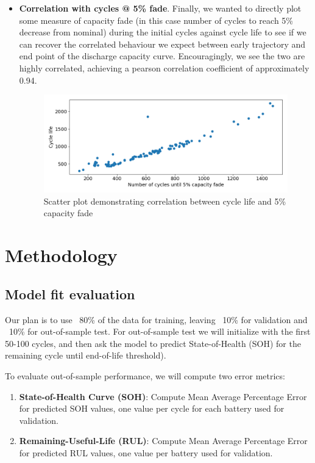 \documentclass{article}
\begin{document}
\begin{itemize}
    \item \textbf{Correlation with cycles @ 5\% fade}. Finally, we wanted to directly plot some measure of capacity fade (in this case number of cycles to reach 5\% decrease from nominal) during the initial cycles against cycle life to see if we can recover the correlated behaviour we expect between early trajectory and end point of the discharge capacity curve. Encouragingly, we see the two are highly correlated, achieving a pearson correlation coefficient of approximately 0.94.

        \begin{figure}[H]
            \centering
            \includegraphics[scale=0.7] {figs/correlation_cycle_life_vs_5pct_fade.png}
            \caption{Scatter plot demonstrating correlation between cycle life and 5\% capacity fade}
            \label{fig:1e}
        \end{figure}

\end{itemize}


\section{Methodology}
\subsection{Model fit evaluation}

Our plan is to use ~80\% of the data for training, leaving ~10\% for validation and ~10\% for out-of-sample test. For out-of-sample test we will initialize with the first 50-100 cycles, and then ask the model to predict State-of-Health (SOH) for the remaining cycle until end-of-life threshold).

To evaluate out-of-sample performance, we will compute two error metrics:
\begin{enumerate}
    \item \textbf{State-of-Health Curve (SOH)}: Compute Mean Average Percentage Error for predicted SOH values, one value per cycle for each battery used for validation. 
    \item \textbf{Remaining-Useful-Life (RUL)}: Compute Mean Average Percentage Error for predicted RUL values, one value per battery used for validation.
\end{enumerate}
\end{document}
